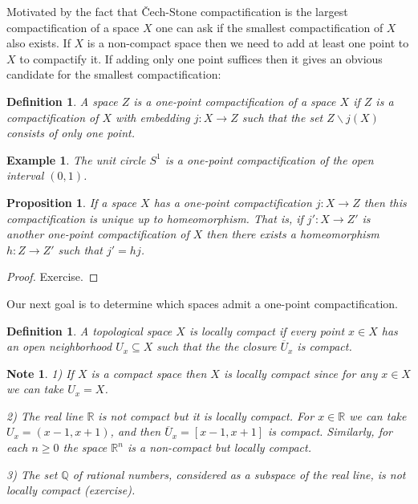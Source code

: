 \documentclass[11pt, letterpaper, oneside]{report}
\theoremstyle{pplain}
\newtheorem{proposition}[theorem]{Proposition}
\newtheorem{ITERMVALUE THM}[theorem]{Intermediate Value Theorem}
\newtheorem{HEINEBOREL THM}[theorem]{Heine-Borel Theorem}
\newtheorem{UMETR THM}[theorem]{Urysohn Metrization Theorem}
\newtheorem{UMETR2 THM}[theorem]{Urysohn Metrization Theorem (v.2)}
\theoremstyle{ddefinition}
\newtheorem{definition}[theorem]{Definition}
\newtheorem{example}[theorem]{Example}
\newtheorem{note}[theorem]{Note}
\theoremstyle{nnn}
\newtheorem{TDA NN}[theorem]{Topological Data Analysis. }
\theoremstyle{eexercise}
\newcommand{\Q}{{\mathbb Q}}
\newcommand{\R}{{\mathbb R}}
\newcommand{\ssmin}{\smallsetminus}
\begin{document}
Motivated by the fact that  \v{C}ech-Stone compactification is the largest compactification of a space $X$
one can  ask if the smallest compactification of $X$ also exists. If $X$ is a non-compact space 
then we need to add at least one point to $X$ to compactify it. If adding only one point suffices then 
it gives an obvious candidate for the smallest compactification:

\begin{definition}
\label{ONEPOINTCOMPACTIF DEF}
A space $Z$ is a \emph{one-point compactification} of a space $X$ if $Z$ is
a compactification of $X$ with embedding $j\colon X \to Z$ such that  
the set $Z\ssmin j(X)$ consists of only one point. 
\end{definition}

\begin{example}
The unit circle $S^{1}$  is a one-point compactification of the open interval $(0, 1)$.  
\end{example}


\begin{proposition}
\label{ONE POINT COMACTIF UNIQUE PROP}
If a space $X$ has a one-point compactification $j\colon X \to Z$ then this compactification 
is unique up to homeomorphism. That is, if $j'\colon X\to Z'$ is another one-point compactification 
of $X$ then there exists a homeomorphism $h\colon Z \to Z'$ such that $j' = hj$. 
\end{proposition}

\begin{proof}
Exercise. 
\end{proof}

Our next goal is to determine  which spaces admit a one-point compactification.  

\begin{definition}
\label{LOCALLY COMPACT DEF}
A topological space $X$ is \emph{locally compact} if every  point $x\in X$ has
an open neighborhood $U_{x}\subseteq X$ such that the the closure 
$\overline{U}_{x}$ is compact. 
\end{definition}

\begin{note}
1) If  $X$ is a compact space then $X$ is locally compact since for any $x\in X$ we can take 
$U_{x} = X$. 

2)  The real line $\R$ is not compact but it is locally compact. For $x \in \R$ we can take 
$U_{x} = (x-1, x+1)$, and then $\overline{U}_{x} = [x-1, x+1]$ is compact. Similarly, for each 
$n\geq 0$ the space $\R^{n}$ is a non-compact but locally compact. 

3) The set $\Q$ of rational numbers, considered as a subspace of the real line, is not locally compact (exercise). 
\end{note}
\end{document}
